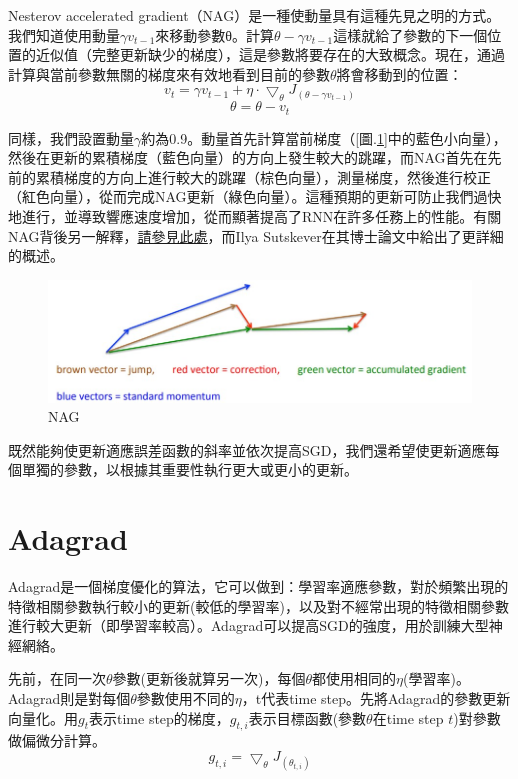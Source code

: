 \documentclass[13pt, a4paper]{report}
\begin{document}
Nesterov accelerated gradient（NAG）是一種使動量具有這種先見之明的方式。我們知道使用動量$\gamma v_{t-1}$來移動參數θ。計算$\theta - \gamma v_{t-1}$這樣就給了參數的下一個位置的近似值（完整更新缺少的梯度），這是參數將要存在的大致概念。現在，通過計算與當前參數無關的梯度來有效地看到目前的參數$\theta$將會移動到的位置：
$$v_t = \gamma v_{t-1}+\eta\cdot\bigtriangledown_{\theta}J_{(\theta-\gamma v_{t-1})}$$
$$\theta = \theta - v_t$$

同樣，我們設置動量$\gamma$約為0.9。動量首先計算當前梯度（[圖.\ref{Fig.NAG}]中的藍色小向量），然後在更新的累積梯度（藍色向量）的方向上發生較大的跳躍，而NAG首先在先前的累積梯度的方向上進行較大的跳躍（棕色向量），測量梯度，然後進行校正（紅色向量），從而完成NAG更新（綠色向量）。這種預期的更新可防止我們過快地進行，並導致響應速度增加，從而顯著提高了RNN在許多任務上的性能。有關NAG背後另一解釋，\href{https://cs231n.github.io/neural-networks-3/}{\underline{請參見此處}}，而Ilya Sutskever在其博士論文中給出了更詳細的概述。
\begin{figure}[hbt!]
\center
\includegraphics[width=15cm]{NAG}
\caption{NAG \href{http://www.cs.toronto.edu/~tijmen/csc321/slides/lecture_slides_lec6.pdf}{\faLink}} 
\label{Fig.NAG}
\end{figure}

既然能夠使更新適應誤差函數的斜率並依次提高SGD，我們還希望使更新適應每個單獨的參數，以根據其重要性執行更大或更小的更新。
\section{Adagrad}
Adagrad是一個梯度優化的算法，它可以做到：學習率適應參數，對於頻繁出現的特徵相關參數執行較小的更新(較低的學習率)，以及對不經常出現的特徵相關參數進行較大更新（即學習率較高）。Adagrad可以提高SGD的強度，用於訓練大型神經網絡。

先前，在同一次$\theta$參數(更新後就算另一次)，每個$\theta$都使用相同的$\eta$(學習率)。Adagrad則是對每個$\theta$參數使用不同的$\eta$，t代表time step。先將Adagrad的參數更新向量化。用$g_t$表示time step的梯度，$g_{t,i}$表示目標函數(參數$\theta$在time step $t$)對參數做偏微分計算。
$$g_{t,i}=\bigtriangledown_{\theta}J_{(\theta_{t,i})}$$
\end{document}
